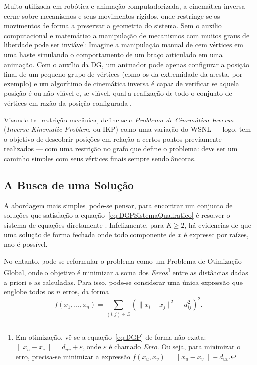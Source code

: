 Muito utilizada em robótica e animação computadorizada, a cinemática inversa cerne sobre mecanismos e seus movimentos rígidos, onde restringe-se os movimentos de forma a preservar a geometria do sistema. Sem o auxilio computacional e matemático a manipulação de mecanismos com muitos graus de liberdade  pode ser inviável: Imagine a manipulação manual de cem vértices em uma haste simulando o comportamento de um braço articulado em uma animação. Com o auxílio da DG, um animador pode apenas configurar a posição final de um pequeno grupo de vértices (como os da extremidade da aresta, por exemplo) e um algorítimo de cinemática inversa é capaz de verificar se aquela posição é ou não viável e, se viável, qual a realização de todo o conjunto de vértices em razão da posição configurada \cite{cinematicaInversa}.

Visando tal restrição mecânica, define-se o \textit{Problema de Cinemática Inversa} (\textit{Inverse Kinematic Problem}, ou IKP) como uma variação do WSNL --- logo, tem o objetivo de descobrir posições em relação a certos pontos previamente realizados --- com uma restrição no grafo que define o problema: deve ser um caminho simples com seus vértices finais sempre sendo âncoras.

\subsection{A Busca de uma Solução}

A abordagem mais simples, pode-se pensar, para encontrar um conjunto de soluções que satisfação a equação~\ref{eq:DGPSistemaQuadratico} é resolver o sistema de equações diretamente \cite{carlileBook31Coloquio}. Infelizmente, para $K \geq 2$, há evidencias de que uma solução de forma fechada onde todo componente de $x$ é expresso por raízes, não é possível. 

No entanto, pode-se reformular o problema como um Problema de Otimização Global, onde o objetivo é minimizar a soma dos \textit{Erros}\footnote{Em otimização, vê-se a equação~\ref{eq:DGP} de forma não exata: $\lVert x_u - x_v \rVert = d_{uv} + \varepsilon$, onde $\varepsilon$ é chamado \textit{Erro}. Ou seja, para minimizar o erro, precisa-se minimizar a expressão $f(x_u,x_v) = \lVert x_u - x_v \rVert - d_{uv}$.} entre as distâncias dadas a priori e as calculadas. Para isso, pode-se considerar uma única expressão que englobe todos os $n$ erros, da forma
\begin{equation}
	f(x_1,\dots,x_n) = \sum_{(i,j)\in E} \left(\lVert x_i - x_j \rVert^2 - d_{ij}^2\right)^2.
		\label{eq:problemaOtimizacaoGlobal1}
\end{equation}

